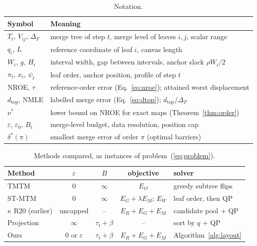 \documentclass[review]{vgtc}                 %
\newcommand{\dtop}{d_{\mathrm{top}}}
\begin{document}
\begin{table}[t]
\caption{Notation.}\label{tab:notation}
\centering\scriptsize\setlength{\tabcolsep}{3pt}
\begin{tabular}{ll}\toprule
Symbol & Meaning\\\midrule
$T_t$, $V_{ij}$, $\Delta_F$ & merge tree of step $t$, merge level of leaves $i,j$, scalar range\\
$q_i$, $L$ & reference coordinate of leaf $i$, canvas length\\
$W_i$, $g$, $H_i$ & interval width, gap between intervals, anchor slack $\rho W_i/2$\\
$\pi_t$, $x_i$, $\psi_t$ & leaf order, anchor position, profile of step $t$\\
NROE, $\tau$ & reference-order error (Eq.~\ref{eq:nroe}); attained worst displacement\\
$\dtop$, NMLE & labelled merge error (Eq.~\ref{eq:dtop}); $\dtop/\Delta_F$\\
$\nu^*$ & lower bound on NROE for exact maps (Theorem~\ref{thm:order})\\
$\varepsilon$, $\varepsilon_0$, $B_t$ & merge-level budget, data resolution, position cap\\
$\delta^*(\pi)$ & smallest merge error of order $\pi$ (optimal barriers)\\\bottomrule
\end{tabular}
\end{table}

\begin{table}[t]
\caption{Methods compared, as instances of problem~(\ref{eq:problem}).}\label{tab:instances}
\centering\scriptsize\setlength{\tabcolsep}{2.5pt}
\begin{tabular}{lcccl}\toprule
Method & $\varepsilon$ & $B$ & objective & solver\\\midrule
TMTM~\cite{Koepp:2023:TMTM} & 0 & $\infty$ & $E_O$ & greedy subtree flips\\
ST-MTM~\cite{STMTM:2026} & 0 & $\infty$ & $E_G+\lambda E_M$; $E_W$ & leaf order, then QP\\
$\kappa$ R20 (earlier) & uncapped & -- & $E_R+E_G+E_M$ & candidate pool + QP\\
Projection & $\infty$ & $\tau_t+\beta$ & -- & sort by $q$ + QP\\
Ours & 0 or $\varepsilon$ & $\tau_t+\beta$ & $E_R+E_G+E_M$ & Algorithm~\ref{alg:layout}\\\bottomrule
\end{tabular}
\end{table}
\end{document}
